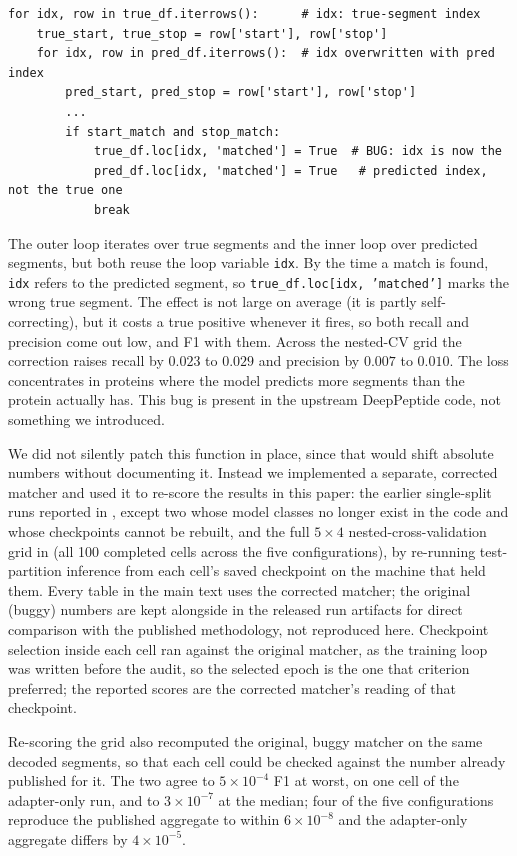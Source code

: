 \documentclass{article}
\begin{document}
\begin{lstlisting}
for idx, row in true_df.iterrows():      # idx: true-segment index
    true_start, true_stop = row['start'], row['stop']
    for idx, row in pred_df.iterrows():  # idx overwritten with pred index
        pred_start, pred_stop = row['start'], row['stop']
        ...
        if start_match and stop_match:
            true_df.loc[idx, 'matched'] = True  # BUG: idx is now the
            pred_df.loc[idx, 'matched'] = True   # predicted index, not the true one
            break
\end{lstlisting}

The outer loop iterates over true segments and the inner loop over predicted segments, but both reuse the loop variable \texttt{idx}. By the time a match is found, \texttt{idx} refers to the predicted segment, so \texttt{true\_df.loc[idx, 'matched']} marks the wrong true segment. The effect is not large on average (it is partly self-correcting), but it costs a true positive whenever it fires, so both recall and precision come out low, and F1 with them. Across the nested-CV grid the correction raises recall by $0.023$ to $0.029$ and precision by $0.007$ to $0.010$. The loss concentrates in proteins where the model predicts more segments than the protein actually has. This bug is present in the upstream DeepPeptide code, not something we introduced.

We did not silently patch this function in place, since that would shift absolute numbers without documenting it. Instead we implemented a separate, corrected matcher and used it to re-score the results in this paper: the earlier single-split runs reported in , except two whose model classes no longer exist in the code and whose checkpoints cannot be rebuilt, and the full $5\times4$ nested-cross-validation grid in  (all 100 completed cells across the five configurations), by re-running test-partition inference from each cell's saved checkpoint on the machine that held them. Every table in the main text uses the corrected matcher; the original (buggy) numbers are kept alongside in the released run artifacts for direct comparison with the published methodology, not reproduced here. Checkpoint selection inside each cell ran against the original matcher, as the training loop was written before the audit, so the selected epoch is the one that criterion preferred; the reported scores are the corrected matcher's reading of that checkpoint.

Re-scoring the grid also recomputed the original, buggy matcher on the same decoded segments, so that each cell could be checked against the number already published for it. The two agree to $5\times10^{-4}$ F1 at worst, on one cell of the adapter-only run, and to $3\times10^{-7}$ at the median; four of the five configurations reproduce the published aggregate to within $6\times10^{-8}$ and the adapter-only aggregate differs by $4\times10^{-5}$.
\end{document}
